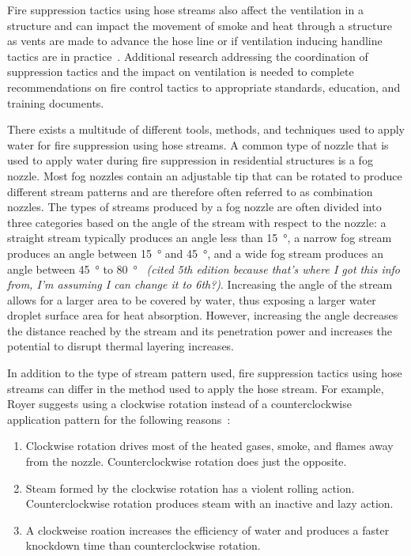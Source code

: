 \documentclass[12pt,oneside]{book}
\begin{document}
Fire suppression tactics using hose streams also affect the ventilation in a structure and can impact the movement of smoke and heat through a structure as vents are made to advance the hose line or if ventilation inducing handline tactics are in practice~\cite{?}. Additional research addressing the coordination of suppression tactics and the impact on ventilation is needed to complete recommendations on fire control tactics to appropriate standards, education, and training documents.

There exists a multitude of different tools, methods, and techniques used to apply water for fire suppression using hose streams. A common type of nozzle that is used to apply water during fire suppression in residential structures is a fog nozzle. Most fog nozzles contain an adjustable tip that can be rotated to produce different stream patterns and are therefore often referred to as combination nozzles. The types of streams produced by a fog nozzle are often divided into three categories based on the angle of the stream with respect to the nozzle: a straight stream typically produces an angle less than 15\SI{}{\degree}, a narrow fog stream produces an angle between 15\SI{}{\degree} and 45\SI{}{\degree}, and a wide fog stream produces an angle between 45\SI{}{\degree} to 80\SI{}{\degree}~\cite{IFSTA:Essentials_of_FF} \textit{(cited 5th edition because that's where I got this info from, I'm assuming I can change it to 6th?)}. Increasing the angle of the stream allows for a larger area to be covered by water, thus exposing a larger water droplet surface area for heat absorption. However, increasing the angle decreases the distance reached by the stream and its penetration power and increases the potential to disrupt thermal layering increases. 

In addition to the type of stream pattern used, fire suppression tactics using hose streams can differ in the method used to apply the hose stream. For example, Royer suggests using a clockwise rotation instead of a counterclockwise application pattern for the following reasons~\cite{Royer:ISU}:
\begin{enumerate} 
	\item Clockwise rotation drives most of the heated gases, smoke, and flames away from the nozzle. Counterclockwise rotation does just the opposite.
	\item Steam formed by the clockwise rotation has a violent rolling action. Counterclockwise rotation produces steam with an inactive and lazy action.
	\item A clockweise roation increases the efficiency of water and produces a faster knockdown time than counterclockwise rotation.
\end{enumerate}
\end{document}
